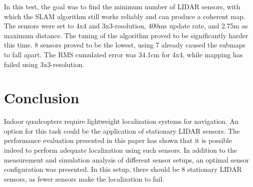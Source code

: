 \documentclass[conference]{IEEEtran}
\begin{document}
In this test, the goal was to find the minimum number of LIDAR sensors, with which the SLAM algorithm still 
works reliably and can produce a coherent map. The sensors were set to 4x4 and 3x3-resolution, 400ms update 
rate, and 2.75m as maximum distance. The tuning of the algorithm proved to be significantly harder this time. 
8 sensors proved to be the lowest, using 7 already caused the submaps to fall apart. The RMS cumulated error 
was 34.1cm for 4x4, while mapping has failed using 3x3-resolution.  


\section{Conclusion}
Indoor quadcopters require lightweight localization systems for navigation. An option for this task could be the application of stationary LIDAR sensors. The performance evaluation presented in this paper has shown that it is possible indeed to perform adequate localization using such sensors. In addition to the measurement and simulation analysis of different sensor setups, an optimal sensor configuration was presented. In this setup, there should be 8 stationary LIDAR sensors, as fewer sensors make the localization to fail.









%


\end{document}
